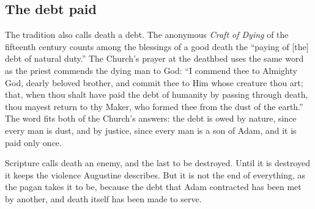 \subsection{The debt paid}

The tradition also calls death a debt. The anonymous \emph{Craft of Dying} of the fifteenth century counts among the blessings of a good death the ``paying of [the] debt of natural duty.'' The Church's prayer at the deathbed uses the same word as the priest commends the dying man to God: ``I commend thee to Almighty God, dearly beloved brother, and commit thee to Him whose creature thou art; that, when thou shalt have paid the debt of humanity by passing through death, thou mayest return to thy Maker, who formed thee from the dust of the earth.'' The word fits both of the Church's answers: the debt is owed by nature, since every man is dust, and by justice, since every man is a son of Adam, and it is paid only once.

Scripture calls death an enemy, and the last to be destroyed. Until it is destroyed it keeps the violence Augustine describes. But it is not the end of everything, as the pagan takes it to be, because the debt that Adam contracted has been met by another, and death itself has been made to serve.
